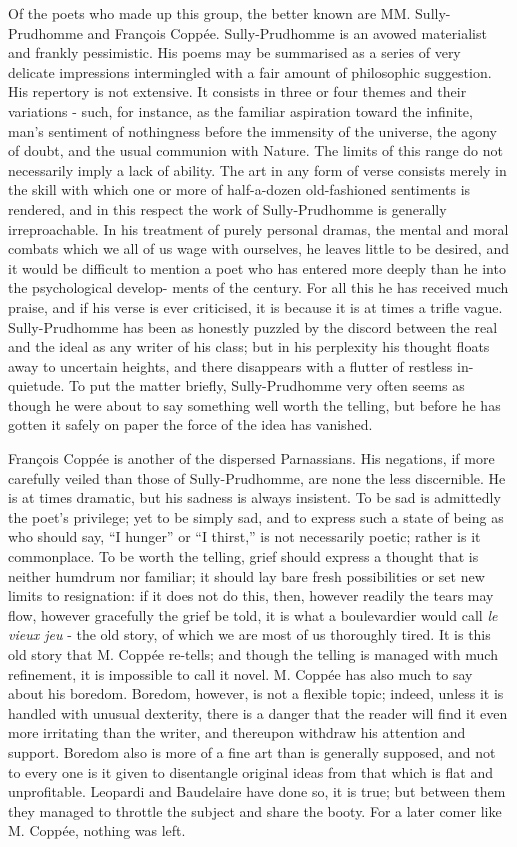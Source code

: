 \documentclass[]{book}
\begin{document}
Of the poets who made up this group, the better known are MM.
Sully-Prudhomme and François Coppée. Sully-Prudhomme is an avowed
materialist and frankly pessimistic. His poems may be summarised as a
series of very delicate impressions intermingled with a fair amount of
philosophic suggestion. His repertory is not extensive. It consists in
three or four themes and their variations - such, for instance, as the
familiar aspiration toward the infinite, man's sentiment of nothingness
before the immensity of the universe, the agony of doubt, and the usual
communion with Nature. The limits of this range do not necessarily imply
a lack of ability. The art in any form of verse consists merely in the
skill with which one or more of half-a-dozen old-fashioned sentiments is
rendered, and in this respect the work of Sully-Prudhomme is generally
irreproachable. In his treatment of purely personal dramas, the mental
and moral combats which we all of us wage with ourselves, he leaves
little to be desired, and it would be difficult to mention a poet who
has entered more deeply than he into the psychological develop- ments of
the century. For all this he has received much praise, and if his verse
is ever criticised, it is because it is at times a trifle vague.
Sully-Prudhomme has been as honestly puzzled by the discord between the
real and the ideal as any writer of his class; but in his perplexity his
thought floats away to uncertain heights, and there disappears with a
flutter of restless in-quietude. To put the matter briefly,
Sully-Prudhomme very often seems as though he were about to say
something well worth the telling, but before he has gotten it safely on
paper the force of the idea has vanished.

François Coppée is another of the dispersed Parnassians. His negations,
if more carefully veiled than those of Sully-Prudhomme, are none the
less discernible. He is at times dramatic, but his sadness is always
insistent. To be sad is admittedly the poet's privilege; yet to be
simply sad, and to express such a state of being as who should say, ``I
hunger'' or ``I thirst,'' is not necessarily poetic; rather is it
commonplace. To be worth the telling, grief should express a thought
that is neither humdrum nor familiar; it should lay bare fresh
possibilities or set new limits to resignation: if it does not do this,
then, however readily the tears may flow, however gracefully the grief
be told, it is what a boulevardier would call \emph{le vieux jeu} - the
old story, of which we are most of us thoroughly tired. It is this old
story that M. Coppée re-tells; and though the telling is managed with
much refinement, it is impossible to call it novel. M. Coppée has also
much to say about his boredom. Boredom, however, is not a flexible
topic; indeed, unless it is handled with unusual dexterity, there is a
danger that the reader will find it even more irritating than the
writer, and thereupon withdraw his attention and support. Boredom also
is more of a fine art than is generally supposed, and not to every one
is it given to disentangle original ideas from that which is flat and
unprofitable. Leopardi and Baudelaire have done so, it is true; but
between them they managed to throttle the subject and share the booty.
For a later comer like M. Coppée, nothing was left.
\end{document}
